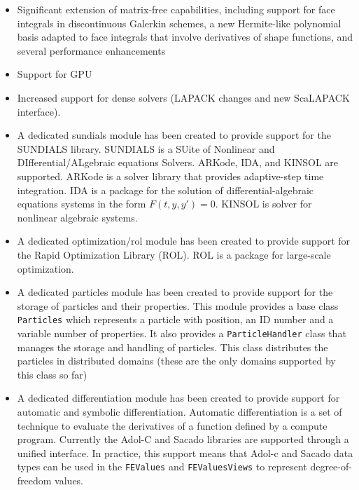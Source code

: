 \documentclass{ansarticle-preprint}
\begin{document}
\begin{itemize}
\item
  Significant extension of matrix-free capabilities, including support for face integrals in discontinuous Galerkin schemes, a new Hermite-like polynomial basis adapted to face integrals that involve derivatives of shape functions, and several performance enhancements

\item
  Support for GPU

\item
  Increased support for dense solvers (LAPACK changes and new ScaLAPACK
  interface).

\item
  A dedicated sundials module has been created to provide support for the
  SUNDIALS library. SUNDIALS is a SUite of Nonlinear and
  DIfferential/ALgebraic equations Solvers. ARKode, IDA, and KINSOL are
  supported. ARKode is a solver library that provides adaptive-step time
  integration. IDA is a package for the solution of differential-algebraic
  equations systems in the form $F(t,y,y')=0$. KINSOL is solver for nonlinear
  algebraic systems.

\item 
  A dedicated optimization/rol module has been created to provide support for
  the Rapid Optimization Library (ROL). ROL is a package for large-scale
  optimization.

\item
  A dedicated particles module has been created to provide support for the
  storage of particles and their properties. This module provides a base class
  \texttt{Particles} which represents a particle with position, an ID number and
  a variable number of properties. It also provides a \texttt{ParticleHandler}
  class that manages the storage and handling of particles. This class
  distributes the particles in distributed domains (these are the only domains
  supported by this class so far)

\item
  A dedicated differentiation module has been created to provide support for
  automatic and symbolic differentiation. Automatic differentiation is a set of
  technique to evaluate the derivatives of a function defined by a compute
  program. Currently the Adol-C and Sacado libraries are supported through a
  unified interface. In practice, this support means that Adol-c and Sacado
  data types can be used in the \texttt{FEValues} and \texttt{FEValuesViews}
  to represent degree-of-freedom values.


\end{itemize}
\end{document}
